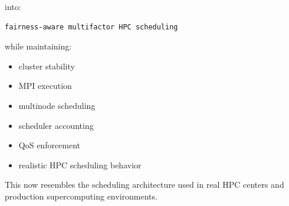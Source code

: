 \documentclass[11pt]{article}
\begin{document}
into:

\begin{verbatim}
fairness-aware multifactor HPC scheduling
\end{verbatim}

while maintaining:

\begin{itemize}
\item cluster stability
\item MPI execution
\item multinode scheduling
\item scheduler accounting
\item QoS enforcement
\item realistic HPC scheduling behavior
\end{itemize}

This now resembles the scheduling architecture used in real HPC centers
and production supercomputing environments.
\end{document}
